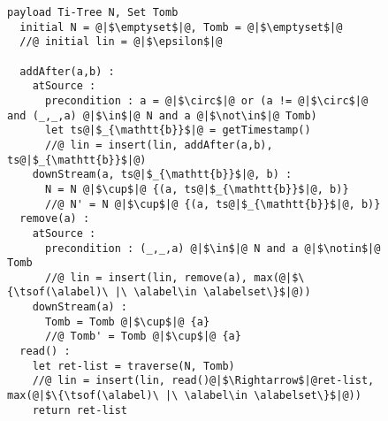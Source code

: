 \begin{figure}[t]
\begin{lstlisting}[basicstyle=\ttfamily\scriptsize,caption={\vspace{-1mm}Replicated Growing Array (RGA) CRDT pseudo-code.},captionpos=b,label={lst:rga}]
  payload Ti-Tree N, Set Tomb
  initial N = @|$\emptyset$|@, Tomb = @|$\emptyset$|@
  //@ initial lin = @|$\epsilon$|@

  addAfter(a,b) :
    atSource :
      precondition : a = @|$\circ$|@ or (a != @|$\circ$|@ and (_,_,a) @|$\in$|@ N and a @|$\not\in$|@ Tomb)
      let ts@|$_{\mathtt{b}}$|@ = getTimestamp()
      //@ lin = insert(lin, addAfter(a,b), ts@|$_{\mathtt{b}}$|@)
    downStream(a, ts@|$_{\mathtt{b}}$|@, b) :
      N = N @|$\cup$|@ {(a, ts@|$_{\mathtt{b}}$|@, b)}
      //@ N' = N @|$\cup$|@ {(a, ts@|$_{\mathtt{b}}$|@, b)}
  remove(a) :
    atSource :
      precondition : (_,_,a) @|$\in$|@ N and a @|$\notin$|@ Tomb
      //@ lin = insert(lin, remove(a), max(@|$\{\tsof(\alabel)\ |\ \alabel\in \alabelset\}$|@))
    downStream(a) :
      Tomb = Tomb @|$\cup$|@ {a}
      //@ Tomb' = Tomb @|$\cup$|@ {a}
  read() :
    let ret-list = traverse(N, Tomb)
    //@ lin = insert(lin, read()@|$\Rightarrow$|@ret-list, max(@|$\{\tsof(\alabel)\ |\ \alabel\in \alabelset\}$|@))
    return ret-list
\end{lstlisting}
\vspace{-5mm}
\end{figure} 
